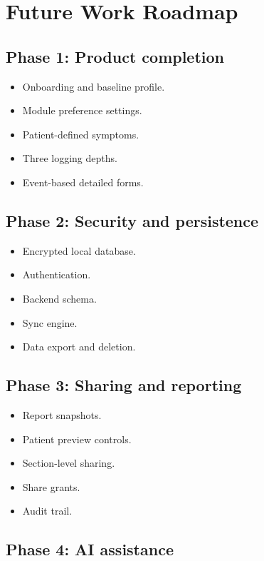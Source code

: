 \documentclass[11pt,a4paper]{article}
\begin{document}
\section{Future Work Roadmap}

\subsection{Phase 1: Product completion}

\begin{itemize}
  \item Onboarding and baseline profile.
  \item Module preference settings.
  \item Patient-defined symptoms.
  \item Three logging depths.
  \item Event-based detailed forms.
\end{itemize}

\subsection{Phase 2: Security and persistence}

\begin{itemize}
  \item Encrypted local database.
  \item Authentication.
  \item Backend schema.
  \item Sync engine.
  \item Data export and deletion.
\end{itemize}

\subsection{Phase 3: Sharing and reporting}

\begin{itemize}
  \item Report snapshots.
  \item Patient preview controls.
  \item Section-level sharing.
  \item Share grants.
  \item Audit trail.
\end{itemize}

\subsection{Phase 4: AI assistance}
\end{document}
